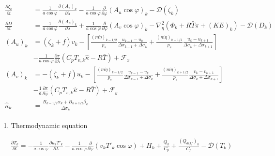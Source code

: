 \begin{eqnarray}
\begin{aligned}
  \frac{\partial \zeta_k}{\partial t}
        &=  \frac{1}{a\cos\varphi}
            \frac{\partial (A_v)_k}{\partial \lambda}
          - \frac{1}{a\cos\varphi}
            \frac{\partial }{\partial \varphi} (A_u \cos\varphi)_k
          - {\mathcal D}(\zeta_k) \\
  \frac{\partial D}{\partial t}
        &=  \frac{1}{a\cos\varphi}
            \frac{\partial (A_u)_k}{\partial \lambda}
          + \frac{1}{a\cos\varphi}
            \frac{\partial }{\partial \varphi} (A_v \cos\varphi)_k
          - \nabla^{2}_{\eta}
           ( \Phi_k + R\bar{T} \pi
             + ({\mathit KE})_k )
          - {\mathcal D}(D_k) \\
  (A_u)_k
    &= ( \zeta_k + f ) v_k
             - \left[ \frac{(m\dot{\eta})_{k-1/2}}{p_s} \frac{u_{k-1} - u_k}{\Delta\sigma_{k-1}+\Delta\sigma_k}
               + \frac{(m\dot{\eta})_{k+1/2}}{p_s} \frac{u_k   - u_{k+1}}{\Delta\sigma_{k}+\Delta\sigma_{k+1}} \right] \\
           &- \frac{1}{a\cos\varphi} \frac{\partial \pi}{\partial \lambda}(C_p T_{v,k}\hat{\kappa}-R\bar{T})
             + {\mathcal F}_x \\
  (A_v)_k
    &=  - ( \zeta_k + f ) u_k
             - \left[ \frac{(m\dot{\eta})_{k-1/2}}{p_s} \frac{v_{k-1} - v_k}{\Delta\sigma_{k-1}+\Delta\sigma_k}
               + \frac{(m\dot{\eta})_{k+1/2}}{p_s} \frac{v_k   - v_{k+1}}{\Delta\sigma_{k}+\Delta\sigma_{k+1}} \right] \\
           &- \frac{1}{a} \frac{\partial \pi}{\partial \varphi}(C_p T_{v,k}\hat{\kappa}-R\bar{T})
             + {\mathcal F}_y \\
   \hat{\kappa}_k
    &=\frac{ B_{k-1/2} \alpha_k + B_{k+1/2} \beta_k }
            { \Delta\sigma_k                                  } \end{aligned}\end{eqnarray}

\begin{enumerate}
\def\labelenumi{\arabic{enumi}.}
\tightlist
\item
  Thermodynamic equation
\end{enumerate}

\begin{eqnarray}
  \frac{\partial T_k}{\partial t}
     =  - \frac{1}{a\cos\varphi}
               \frac{\partial u_k T'_k}{\partial \lambda}
          - \frac{1}{a\cos\varphi}
               \frac{\partial }{\partial \varphi} (v_k T'_k \cos\varphi)
          + H_k
        + \frac{Q_k}{C_{p}}
          + \frac{(Q_{diff})_k}{C_p}
          - {\mathcal D}(T_k)  \end{eqnarray}

